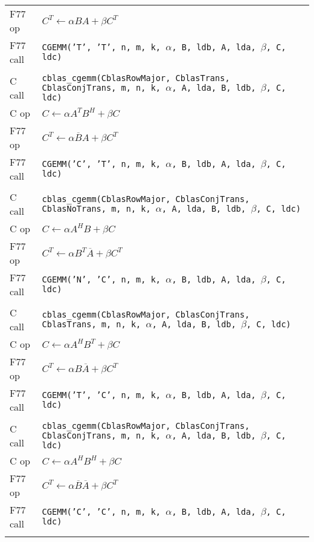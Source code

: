 \documentclass{article}
\begin{document}
{\begin{tabular}{ll}
F77 op   & $C^T \leftarrow \alpha B A + \beta C^T$\\
F77 call & {\tt CGEMM('T', 'T', n, m, k, $\alpha$, B, ldb, A, lda, $\beta$, C, ldc)}\\\\
%
C call   & {\tt cblas\_cgemm(CblasRowMajor, CblasTrans, CblasConjTrans, m, n, k, $\alpha$, A, lda, B, ldb, $\beta$, C, ldc)}\\
C op     & $C \leftarrow \alpha A^T B^H + \beta C$\\
F77 op   & $C^T \leftarrow \alpha \overline{B} A + \beta C^T$\\
F77 call & {\tt CGEMM('C', 'T', n, m, k, $\alpha$, B, ldb, A, lda, $\beta$, C, ldc)}\\\\
%
C call   & {\tt cblas\_cgemm(CblasRowMajor, CblasConjTrans, CblasNoTrans, m, n, k, $\alpha$, A, lda, B, ldb, $\beta$, C, ldc)}\\
C op     & $C \leftarrow \alpha A^H B + \beta C$\\
F77 op   & $C^T \leftarrow \alpha B^T \overline{A} + \beta C^T$\\
F77 call & {\tt CGEMM('N', 'C', n, m, k, $\alpha$, B, ldb, A, lda, $\beta$, C, ldc)}\\\\
%
C call   & {\tt cblas\_cgemm(CblasRowMajor, CblasConjTrans, CblasTrans, m, n, k, $\alpha$, A, lda, B, ldb, $\beta$, C, ldc)}\\
C op     & $C \leftarrow \alpha A^H B^T + \beta C$\\
F77 op   & $C^T \leftarrow \alpha B \overline{A} + \beta C^T$\\
F77 call & {\tt CGEMM('T', 'C', n, m, k, $\alpha$, B, ldb, A, lda, $\beta$, C, ldc)}\\\\
%
C call   & {\tt cblas\_cgemm(CblasRowMajor, CblasConjTrans, CblasConjTrans, m, n, k, $\alpha$, A, lda, B, ldb, $\beta$, C, ldc)}\\
C op     & $C \leftarrow \alpha A^H B^H + \beta C$\\
F77 op   & $C^T \leftarrow \alpha \overline{B} \overline{A} + \beta C^T$\\
F77 call & {\tt CGEMM('C', 'C', n, m, k, $\alpha$, B, ldb, A, lda, $\beta$, C, ldc)}\\\\
\end{tabular}
}
\end{document}
